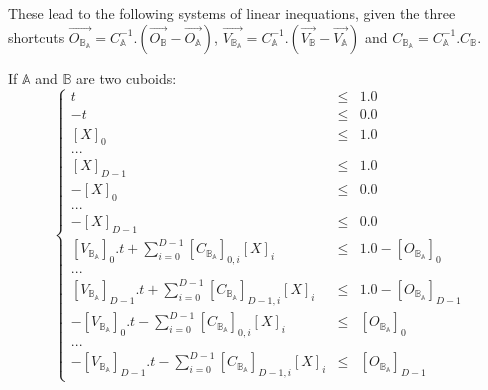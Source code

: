 \documentclass[12pt, a4paper]{article}
\begin{document}
These lead to the following systems of linear inequations, given the three shortcuts $\overrightarrow{O_{\mathbb{B}_\mathbb{A}}}=C_\mathbb{A}^{-1}.(\overrightarrow{O_\mathbb{B}}-\overrightarrow{O_\mathbb{A}})$, $\overrightarrow{V_{\mathbb{B}_\mathbb{A}}}=C_\mathbb{A}^{-1}.(\overrightarrow{V_\mathbb{B}}-\overrightarrow{V_\mathbb{A}})$ and $C_{\mathbb{B}_\mathbb{A}}=C_\mathbb{A}^{-1}.C_{\mathbb{B}}$.

If $\mathbb{A}$ and $\mathbb{B}$ are two cuboids:
\begin{equation}
\left\lbrace
\begin{array}{rcl}
t&\le&1.0\\
-t&\le&0.0\\
\left[X\right]_0&\le&1.0\\
...\\
\left[X\right]_{D-1}&\le&1.0\\
-\left[X\right]_0&\le&0.0\\
...\\
-\left[X\right]_{D-1}&\le&0.0\\
\left[V_{\mathbb{B}_\mathbb{A}}\right]_0.t+\sum_{i=0}^{D-1}\left[C_{\mathbb{B}_\mathbb{A}}\right]_{0,i}\left[X\right]_i&\le&1.0-\left[O_{\mathbb{B}_\mathbb{A}}\right]_0\\
...\\
\left[V_{\mathbb{B}_\mathbb{A}}\right]_{D-1}.t+\sum_{i=0}^{D-1}\left[C_{\mathbb{B}_\mathbb{A}}\right]_{D-1,i}\left[X\right]_i&\le&1.0-\left[O_{\mathbb{B}_\mathbb{A}}\right]_{D-1}\\
-\left[V_{\mathbb{B}_\mathbb{A}}\right]_0.t-\sum_{i=0}^{D-1}\left[C_{\mathbb{B}_\mathbb{A}}\right]_{0,i}\left[X\right]_i&\le&\left[O_{\mathbb{B}_\mathbb{A}}\right]_0\\
...\\
-\left[V_{\mathbb{B}_\mathbb{A}}\right]_{D-1}.t-\sum_{i=0}^{D-1}\left[C_{\mathbb{B}_\mathbb{A}}\right]_{D-1,i}\left[X\right]_i&\le&\left[O_{\mathbb{B}_\mathbb{A}}\right]_{D-1}
\end{array}
\right.
\end{equation}
\end{document}
